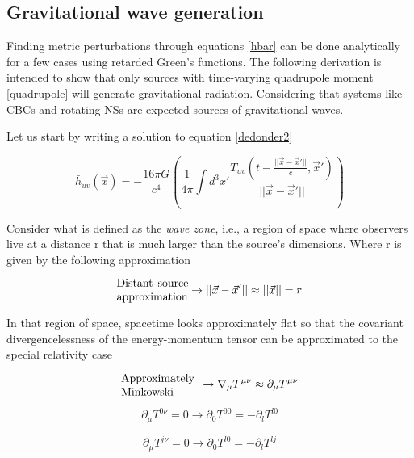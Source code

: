 \subsection{Gravitational wave generation}

Finding metric perturbations through equations \ref{hbar} can be done analytically for a few cases using retarded Green's functions. The following derivation is intended to show that only sources with time-varying quadrupole moment \ref{quadrupole} will generate gravitational radiation\cite{Hartle:2021pel,Creighton:2011zz}. Considering that systems like CBCs and rotating NSs are expected sources of gravitational waves.

Let us start by writing a solution to equation \ref{dedonder2}

\begin{equation}\label{pert.int}
\bar{h}_{uv}(\vec{x}) = -\frac{16\pi G}{c^4} \left( \frac{1}{4\pi} \int d^3x' \frac{T_{uv} \left( t - \frac{|| \vec{x}-\vec{x}' ||}{c} , \vec{x}' \right)  }{|| \vec{x}-\vec{x}' ||} \right)
\end{equation}


Consider what is defined as the \textit{wave zone}, i.e., a region of space where observers live at a distance r that is much larger than the source's dimensions. Where r is given by the following approximation 

\begin{equation}
\parbox{6.4em}{Distant source approximation}  \rightarrow || \vec{x} - \vec{x}'|| \approx || \vec{x} || = r
\end{equation}

In that region of space, spacetime looks approximately flat so that the covariant divergencelessness of the energy-momentum tensor can be approximated to the special relativity case


\begin{equation}
\parbox{6.4em}{Approximately Minkowski} \hspace{2mm} \rightarrow \nabla_{\mu} T^{\mu \nu} \approx \partial_\mu T^{\mu \nu}
\end{equation}

\begin{equation}\label{1eq}
\partial_{\mu} T^{0 \nu} = 0 \rightarrow \partial_{0} T^{0 0} = -\partial_{l} T^{l 0}
\end{equation}

\begin{equation}\label{2eq}
\partial_{\mu} T^{j \nu} = 0 \rightarrow \partial_{0} T^{l 0} = -\partial_{l} T^{l j}
\end{equation}

